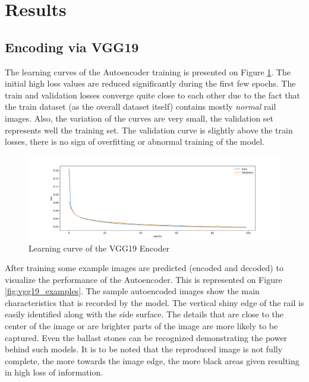 \section{Results} \label{results}
\subsection{Encoding via VGG19}
The learning curves of the Autoencoder training is presented on Figure \ref{fig:vgg19_learning_curve}.
The initial high loss values are reduced significantly during the first few epochs.
The train and validation losses converge quite close to each other due to the fact that
the train dataset (as the overall dataset itself) contains mostly \emph{normal} rail images.
Also, the variation of the curves are very small, the validation set represents well the training set.
The validation curve is slightly above the train losses, there is no sign of overfitting or abnormal
training of the model.

\begin{figure}[H]
    \centering
    \includegraphics[width=\textwidth,trim={0 0 0 1cm},clip]{./results/vgg19_vgg19/20230510_172958_results.png}
    \caption{Learning curve of the VGG19 Encoder}
    \label{fig:vgg19_learning_curve}
\end{figure}

After training some example images are predicted (encoded and decoded) to visualize the performance
of the Autoencoder.
This is represented on Figure \ref{fig:vgg19_examples}.
The sample autoencoded images show the main characteristics that is recorded by the model.
The vertical shiny edge of the rail is easily identified along with the side surface.
The details that are close to the center of the image or are brighter parts of the image are
more likely to be captured.
Even the ballast stones can be recognized demonstrating the power behind such models.
It is to be noted that the reproduced image is not fully complete,
the more towards the image edge, the more black areas given resulting in high loss of information.


